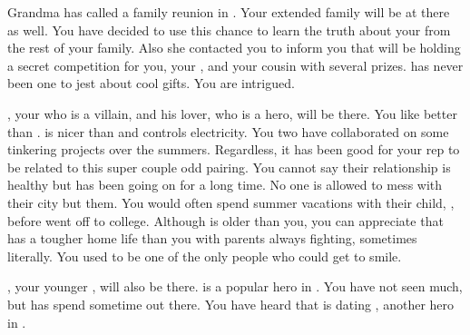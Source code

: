 \documentclass[char]{LRSguildcamp1}
\begin{document}
Grandma has called a family reunion in \pCityGrandma{}. Your extended family will be at there as well. You have decided to use this chance to learn the truth about your \cAS{\parent} from the rest of your family. Also she contacted you to inform you that \cGrandma{\they} will be holding a secret competition for you, your \cTween{\sibling}, and your cousin with several prizes. \cGrandma{} has never been one to jest about cool gifts. You are intrigued.  

\cOldest{}, your \cOldest{\uncle} who is a villain, and his lover, \cOS{} who is a hero, will be there. You like \cOS{} better than \cOldest{}. \cOS{\They} is nicer than \cOldest{} and controls electricity. You two have collaborated on some tinkering projects over the summers. Regardless, it has been good for your rep to be related to this super couple odd pairing. You cannot say their relationship is healthy but has been going on for a long time. No one is allowed to mess with their city but them.  You would often spend summer vacations with their child, \cGrad{}, before \cGrad{\they} went off to college. Although \cGrad{} is older than you, you can appreciate that \cGrad{} has a tougher home life than you with parents always fighting, sometimes literally. You used to be one of the only people who could get \cGrad{} to smile.

\cYoungest{}, your younger \cYoungest{\uncle}, will also be there. \cYoungest{\They} is a popular hero in \pCityYoungest{}. You have not seen \cYoungest{\them} much, but \cTween{} has spend sometime out there. You have heard that \cYoungest{} is dating \cYS{}, another hero in \pCityYoungest{}.
\end{document}
